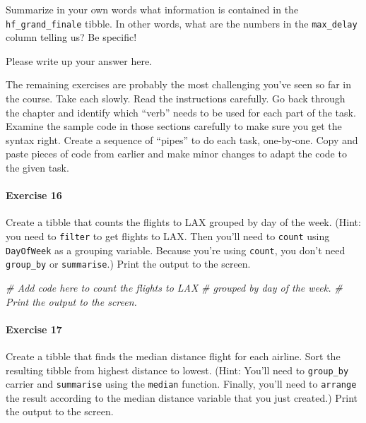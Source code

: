 \documentclass[
]{book}
\newenvironment{Shaded}{\begin{snugshade}}{\end{snugshade}}
\newcommand{\CommentTok}[1]{\textcolor[rgb]{0.56,0.35,0.01}{\textit{#1}}}
\begin{document}
Summarize in your own words what information is contained in the \texttt{hf\_grand\_finale} tibble. In other words, what are the numbers in the \texttt{max\_delay} column telling us? Be specific!

Please write up your answer here.

The remaining exercises are probably the most challenging you've seen so far in the course. Take each slowly. Read the instructions carefully. Go back through the chapter and identify which ``verb'' needs to be used for each part of the task. Examine the sample code in those sections carefully to make sure you get the syntax right. Create a sequence of ``pipes'' to do each task, one-by-one. Copy and paste pieces of code from earlier and make minor changes to adapt the code to the given task.

\hypertarget{exercise-16}{%
\paragraph*{Exercise 16}\label{exercise-16}}

Create a tibble that counts the flights to LAX grouped by day of the week. (Hint: you need to \texttt{filter} to get flights to LAX. Then you'll need to \texttt{count} using \texttt{DayOfWeek} as a grouping variable. Because you're using \texttt{count}, you don't need \texttt{group\_by} or \texttt{summarise}.) Print the output to the screen.

\begin{Shaded}
\begin{Highlighting}[]
\CommentTok{\# Add code here to count the flights to LAX}
\CommentTok{\# grouped by day of the week.}
\CommentTok{\# Print the output to the screen.}
\end{Highlighting}
\end{Shaded}

\hypertarget{exercise-17}{%
\paragraph*{Exercise 17}\label{exercise-17}}

Create a tibble that finds the median distance flight for each airline. Sort the resulting tibble from highest distance to lowest. (Hint: You'll need to \texttt{group\_by} carrier and \texttt{summarise} using the \texttt{median} function. Finally, you'll need to \texttt{arrange} the result according to the median distance variable that you just created.) Print the output to the screen.
\end{document}

